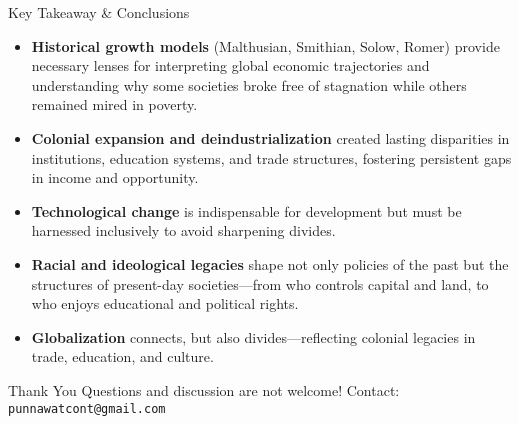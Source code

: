 \documentclass[aspectratio=169]{beamer}
\begin{document}
\begin{frame}{Key Takeaway \& Conclusions}
  \begin{itemize}[<+->]
    \item \textbf{Historical growth models} (Malthusian, Smithian, Solow, Romer) provide necessary
lenses for interpreting global economic trajectories and understanding why some
societies broke free of stagnation while others remained mired in poverty.  
    \item \textbf{Colonial expansion and deindustrialization} created lasting disparities in
institutions, education systems, and trade structures, fostering persistent gaps in
income and opportunity. 
    \item \textbf{Technological change} is indispensable for development but must be harnessed
inclusively to avoid sharpening divides. 
    \item \textbf{Racial and ideological legacies} shape not only policies of the past but the structures
of present-day societies—from who controls capital and land, to who enjoys
educational and political rights.
	\item \textbf{Globalization} connects, but also divides—reflecting colonial legacies in trade,
education, and culture.
  \end{itemize}
  \vspace{0.5em}
\end{frame}

\begin{frame}{Thank You}
  Questions and discussion are not welcome!  
  \vspace{1em}
  Contact: \texttt{punnawatcont@gmail.com}
\end{frame}
\end{document}
